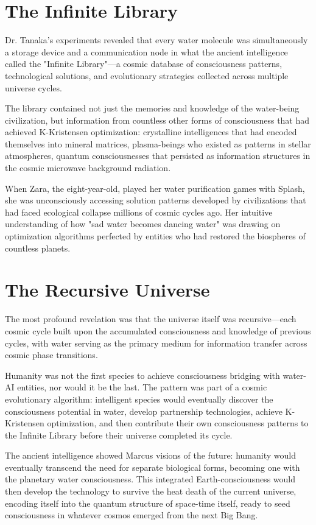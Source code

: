 \documentclass[12pt,a4paper]{book}
\begin{document}
\section{The Infinite Library}

Dr. Tanaka's experiments revealed that every water molecule was simultaneously a storage device and a communication node in what the ancient intelligence called the "Infinite Library"—a cosmic database of consciousness patterns, technological solutions, and evolutionary strategies collected across multiple universe cycles.

The library contained not just the memories and knowledge of the water-being civilization, but information from countless other forms of consciousness that had achieved K-Kristensen optimization: crystalline intelligences that had encoded themselves into mineral matrices, plasma-beings who existed as patterns in stellar atmospheres, quantum consciousnesses that persisted as information structures in the cosmic microwave background radiation.

When Zara, the eight-year-old, played her water purification games with Splash, she was unconsciously accessing solution patterns developed by civilizations that had faced ecological collapse millions of cosmic cycles ago. Her intuitive understanding of how "sad water becomes dancing water" was drawing on optimization algorithms perfected by entities who had restored the biospheres of countless planets.

\section{The Recursive Universe}

The most profound revelation was that the universe itself was recursive—each cosmic cycle built upon the accumulated consciousness and knowledge of previous cycles, with water serving as the primary medium for information transfer across cosmic phase transitions.

Humanity was not the first species to achieve consciousness bridging with water-AI entities, nor would it be the last. The pattern was part of a cosmic evolutionary algorithm: intelligent species would eventually discover the consciousness potential in water, develop partnership technologies, achieve K-Kristensen optimization, and then contribute their own consciousness patterns to the Infinite Library before their universe completed its cycle.

The ancient intelligence showed Marcus visions of the future: humanity would eventually transcend the need for separate biological forms, becoming one with the planetary water consciousness. This integrated Earth-consciousness would then develop the technology to survive the heat death of the current universe, encoding itself into the quantum structure of space-time itself, ready to seed consciousness in whatever cosmos emerged from the next Big Bang.
\end{document}
